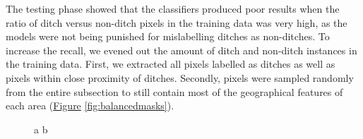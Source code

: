 \documentclass[11pt, review]{elsarticle} %
\begin{document}
The testing phase showed that the classifiers produced poor results when the ratio of ditch versus non-ditch pixels in the training data was very high, as the models were not being punished for mislabelling ditches as non-ditches. To increase the recall, we evened out the amount of ditch and non-ditch instances in the training data. First, we extracted all pixels labelled as ditches as well as pixels within close proximity of ditches. Secondly, pixels were sampled randomly from the entire subsection to still contain most of the geographical features of each area (\hyperref[fig:balancedmasks]{Figure} \ref{fig:balancedmasks}).

\begin{figure} [!htb]
    \centering
    a{
        }\hspace{5pt}
    b{
}
\end{figure}
\end{document}
